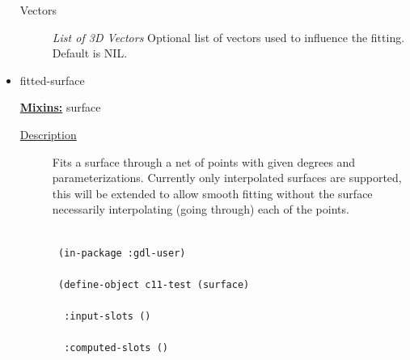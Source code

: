 \documentclass [11pt]{book}
\begin{document}
\begin{itemize}
\begin{description}
\item [Vectors]
\emph{List of 3D Vectors} Optional list of vectors used to influence the fitting. Default is NIL.


\end{description}







\item {}fitted-surface


\textbf{
\underline{Mixins:}} surface





\begin{description}

\item [
\underline{Description}]


Fits a surface through a net of points with given degrees and parameterizations. Currently
only interpolated surfaces are supported, this will be extended to allow smooth fitting without the surface necessarily
interpolating (going through) each of the points.



\end{description}




\begin{figure}
\begin{lrbox}{\boxedverb}
\begin{minipage}{\linewidth}
{\small

\begin{verbatim}

 (in-package :gdl-user)

 (define-object c11-test (surface) 

  :input-slots () 

  :computed-slots ()


\end{verbatim}}
\end{minipage}
\end{lrbox}
\end{figure}
\end{itemize}
\end{document}
